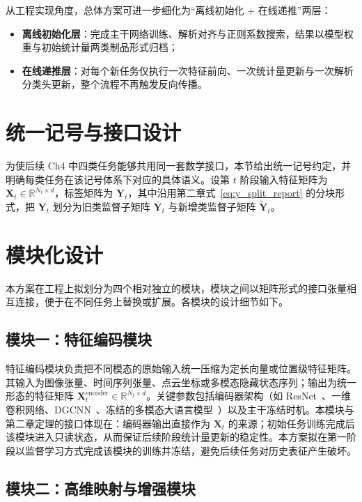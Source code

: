 从工程实现角度，总体方案可进一步细化为“离线初始化 + 在线递推”两层：
\begin{itemize}
    \item \textbf{离线初始化层}：完成主干网络训练、解析对齐与正则系数搜索，结果以模型权重与初始统计量两类制品形式归档；
    \item \textbf{在线递推层}：对每个新任务仅执行一次特征前向、一次统计量更新与一次解析分类头更新，整个流程不再触发反向传播。
\end{itemize}

\section{统一记号与接口设计}

为使后续 Ch4 中四类任务能够共用同一套数学接口，本节给出统一记号约定，并明确每类任务在该记号体系下对应的具体语义。设第 $t$ 阶段输入特征矩阵为 $\mathbf{X}_t\in\mathbb{R}^{N_t\times d}$，标签矩阵为 $\mathbf{Y}_t$，其中沿用第二章式~\eqref{eq:y_split_report} 的分块形式，把 $\mathbf{Y}_t$ 划分为旧类监督子矩阵 $\bar{\mathbf{Y}}_t$ 与新增类监督子矩阵 $\tilde{\mathbf{Y}}_t$。
\section{模块化设计}

本方案在工程上拟划分为四个相对独立的模块，模块之间以矩阵形式的接口张量相互连接，便于在不同任务上替换或扩展。各模块的设计细节如下。

\subsection{模块一：特征编码模块}

特征编码模块负责把不同模态的原始输入统一压缩为定长向量或位置级特征矩阵。其输入为图像张量、时间序列张量、点云坐标或多模态隐藏状态序列；输出为统一形态的特征矩阵 $\mathbf{X}_t^{\mathrm{encoder}}\in\mathbb{R}^{N_t\times d}$。关键参数包括编码器架构（如 ResNet~\citep{he2016resnet}、一维卷积网络、DGCNN~\citep{wang2019dgcnn}、冻结的多模态大语言模型~\citep{liu2023llava}）以及主干冻结时机。本模块与第二章定理的接口体现在：编码器输出直接作为 $\mathbf{X}_t$ 的来源；初始任务训练完成后该模块进入只读状态，从而保证后续阶段统计量更新的稳定性。本方案拟在第一阶段以监督学习方式完成该模块的训练并冻结，避免后续任务对历史表征产生破坏。

\subsection{模块二：高维映射与增强模块}

